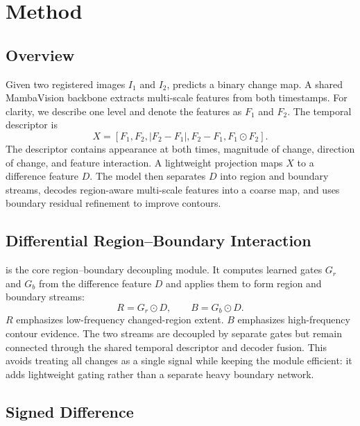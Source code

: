 \section{Method}

\subsection{Overview}

Given two registered images $I_1$ and $I_2$, \ours{} predicts a binary change map. A shared MambaVision backbone extracts multi-scale features from both timestamps. For clarity, we describe one level and denote the features as $F_1$ and $F_2$. The temporal descriptor is
\begin{equation}
X = [F_1, F_2, |F_2-F_1|, F_2-F_1, F_1 \odot F_2].
\label{eq:temporal_descriptor}
\end{equation}
The descriptor contains appearance at both times, magnitude of change, direction of change, and feature interaction. A lightweight projection maps $X$ to a difference feature $D$. The model then separates $D$ into region and boundary streams, decodes region-aware multi-scale features into a coarse map, and uses boundary residual refinement to improve contours.



\subsection{Differential Region--Boundary Interaction}

\drbi{} is the core region--boundary decoupling module. It computes learned gates $G_r$ and $G_b$ from the difference feature $D$ and applies them to form region and boundary streams:
\begin{equation}
R = G_r \odot D, \qquad B = G_b \odot D.
\label{eq:drbi}
\end{equation}
$R$ emphasizes low-frequency changed-region extent. $B$ emphasizes high-frequency contour evidence. The two streams are decoupled by separate gates but remain connected through the shared temporal descriptor and decoder fusion. This avoids treating all changes as a single signal while keeping the module efficient: it adds lightweight gating rather than a separate heavy boundary network.



\subsection{Signed Difference}


